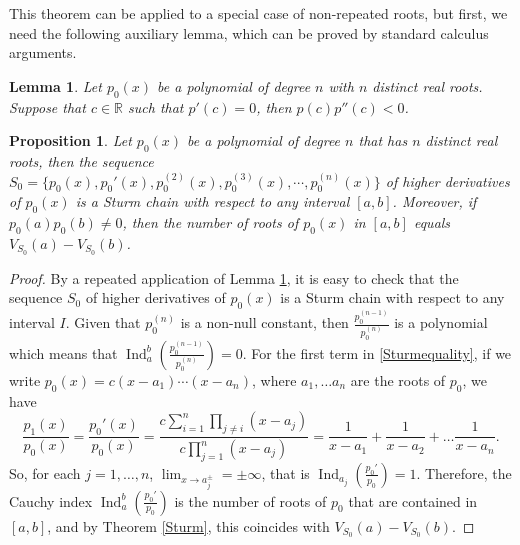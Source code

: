 \documentclass[sn-basic]{sn-jnl}%
\theoremstyle{thmstyleone}%
\newtheorem{proposition}[theorem]{Proposition}%
\theoremstyle{thmstyletwo}%
\theoremstyle{thmstylethree}%
\newcommand{\bR}{{\mathbb{R}}}      %
\DeclareMathOperator{\Ind}{Ind}
\newtheorem{lemma}[theorem]{Lemma}
\begin{document}
\begin{appendices}
This theorem can be applied to a special case of non-repeated roots, but first, we need the following auxiliary lemma, which can be proved by standard calculus arguments.

\begin{lemma}\label{rootsofderivatives}
Let $p_0(x)$ be a polynomial of degree $n$ with $n$ distinct real roots.  Suppose that $c \in \bR$ such that $p'(c) = 0$, then $p(c)p''(c) < 0$.
\end{lemma}

\begin{proposition}\label{sturm_norepeated_roots}
    Let $p_0(x)$ be a polynomial of degree $n$ that has $n$ distinct real roots, then the sequence $ S_0 = \{p_0(x), p_0'(x), p_0^{(2)}(x) , p_0^{(3)}(x), \cdots, p_0^{(n)}(x)\}$ of higher derivatives of $p_0(x)$ is a Sturm chain with respect to any interval $[a,b]$.  Moreover, if $p_0(a)p_0(b) \neq 0$, then the number of roots of $p_0(x)$ in $[a,b]$ equals $V_{S_0}(a)-V_{S_0}(b)$.
\end{proposition}

\begin{proof}
    By a repeated application of Lemma \ref{rootsofderivatives}, it is easy to check that the sequence $S_0$ of higher derivatives of $p_0(x)$ is a Sturm chain with respect to any interval $I$. Given that $p_0^{(n)}$ is a non-null constant, then $\frac{p_0^{(n-1)}}{p_0^{(n)}}$ is a polynomial which means that $\Ind_a^b\left(\frac{p_0^{(n-1)}}{p_0^{(n)}}\right)=0$. For the first term in \ref{Sturmequality}, if we write $p_0(x) = c (x-a_1)\cdots(x-a_n)$, where $a_1 , \ldots a_n$ are the roots of $p_0$, we have
    $$
    \frac{p_1(x)}{p_0(x)} = \frac{p_0'(x)}{p_0(x)} = \frac{ c \sum_{i=1}^n \prod_{j \neq i} (x-a_j)}{ c \prod_{j=1}^n (x-a_j) } = \frac{1}{x - a_1} + \frac{1}{x - a_2} + \ldots \frac{1}{x - a_n}. 
    $$
    So, for each $j = 1, \ldots, n$,  $\lim_{x \to a_j^{\pm}} = \pm \infty$, that is $\Ind_{a_j}\left(\frac{p_0'}{p_0}\right) = 1$. Therefore, the Cauchy index $\Ind_a^b\left(\frac{p_0'}{p_0}\right)$ is the number of roots of $p_0$ that are contained in $[a,b]$, and by Theorem \ref{Sturm}, this coincides with $V_{S_0}(a)-V_{S_0}(b)$.
\end{proof}

\end{appendices}


\end{document}
